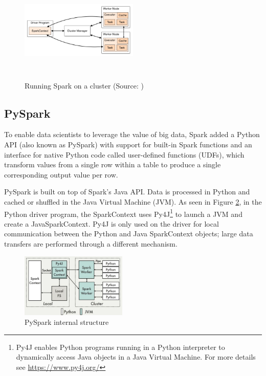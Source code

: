 \begin{figure}[h]
    \centering
    \includegraphics[width=0.5\textwidth, height=5cm]{images/cluster-overview}
    \caption{Running Spark on a cluster (Source: \cite{spark-cluster})}
    \label{fig:spark-cluster}
\end{figure}

\subsection{PySpark}
To enable data scientists to leverage the value of big data, Spark added a Python API (also known as PySpark) with support for built-in Spark functions and an interface for native Python code called user-defined functions (UDFs), which transform values from a single row within a table to produce a single corresponding output value per row.

PySpark is built on top of Spark's Java API. Data is processed in Python and cached or shuffled in the Java Virtual Machine (JVM). As seen in Figure \ref{fig:pyspark}, in the Python driver program, the SparkContext uses Py4J\footnote{Py4J enables Python programs running in a Python interpreter to dynamically access Java objects in a Java Virtual Machine. For more details see \url{https://www.py4j.org/}} to launch a JVM and create a JavaSparkContext. Py4J is only used on the driver for local communication between the Python and Java SparkContext objects; large data transfers are performed through a different mechanism.
\begin{figure}[h]
    \centering
    \includegraphics[width=0.45\textwidth]{images/pyspark.png}
    \caption{PySpark internal structure}
    \label{fig:pyspark}
\end{figure}

